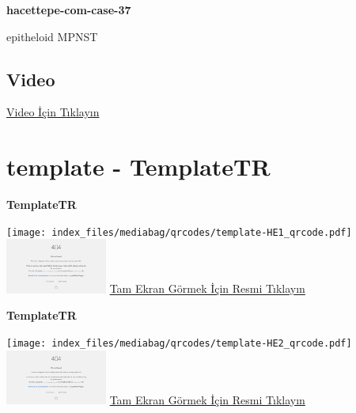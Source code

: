 \documentclass[
  letterpaper,
  DIV=11,
  numbers=noendperiod]{scrreprt}
\begin{document}
\textbf{hacettepe-com-case-37}

\begin{tcolorbox}[enhanced jigsaw, breakable, opacitybacktitle=0.6, arc=.35mm, colbacktitle=quarto-callout-tip-color!10!white, colback=white, toptitle=1mm, left=2mm, opacityback=0, colframe=quarto-callout-tip-color-frame, titlerule=0mm, rightrule=.15mm, bottomrule=.15mm, toprule=.15mm, bottomtitle=1mm, title=\textcolor{quarto-callout-tip-color}{\faLightbulb}\hspace{0.5em}{Tanı}, coltitle=black, leftrule=.75mm]

epitheloid MPNST

\end{tcolorbox}

\hypertarget{video-36}{%
\subsection{Video}\label{video-36}}

\href{https://www.youtube.com/watch?v=H8cnZqL29eI}{Video İçin Tıklayın}

\hypertarget{sec-template}{%
\section{template - TemplateTR}\label{sec-template}}

\textbf{TemplateTR}

\texttt{[image: index\_files/mediabag/qrcodes/template-HE1\_qrcode.pdf]}
\href{https://images.patolojiatlasi.com/template/HE1.html}{\includegraphics[width=0.25\textwidth,height=\textheight]{./screenshots/thumbnail_template-HE1.png}}
\href{https://images.patolojiatlasi.com/template/HE1.html}{Tam Ekran
Görmek İçin Resmi Tıklayın}

\textbf{TemplateTR}

\texttt{[image: index\_files/mediabag/qrcodes/template-HE2\_qrcode.pdf]}
\href{https://images.patolojiatlasi.com/template/HE2.html}{\includegraphics[width=0.25\textwidth,height=\textheight]{./screenshots/thumbnail_template-HE2.png}}
\href{https://images.patolojiatlasi.com/template/HE2.html}{Tam Ekran
Görmek İçin Resmi Tıklayın}
\end{document}
